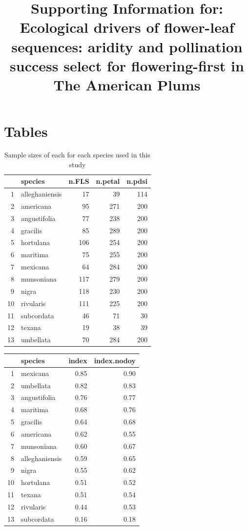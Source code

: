 \documentclass{article}[11pt]
\title{Supporting Information for: Ecological drivers of flower-leaf sequences: aridity and pollination success select for flowering-first in The American Plums} %
\date{}
\begin{document}

\maketitle

\section*{Tables}
\begin{table}[ht]
\centering
\begin{tabular}{rlrrr}
  \hline
 & species & n.FLS & n.petal & n.pdsi \\ 
  \hline
1 & alleghaniensis &  17 &  39 & 114 \\ 
  2 & americana &  95 & 271 & 200 \\ 
  3 & angustifolia &  77 & 238 & 200 \\ 
  4 & gracilis &  85 & 289 & 200 \\ 
  5 & hortulana & 106 & 254 & 200 \\ 
  6 & maritima &  75 & 255 & 200 \\ 
  7 & mexicana &  64 & 284 & 200 \\ 
  8 & munsoniana & 117 & 279 & 200 \\ 
  9 & nigra & 118 & 230 & 200 \\ 
  10 & rivularis & 111 & 225 & 200 \\ 
  11 & subcordata &  46 &  71 &  30 \\ 
  12 & texana &  19 &  38 &  39 \\ 
  13 & umbellata &  70 & 284 & 200 \\ 
   \hline
\end{tabular}
\caption{Sample sizes of each for each species used in this study}
\label{tab:samps}
\end{table}

\begin{table}[ht]
\centering
\begin{tabular}{rlrr}
  \hline
 & species & index & index.nodoy \\ 
  \hline
1 & mexicana & 0.85 & 0.90 \\ 
  2 & umbellata & 0.82 & 0.83 \\ 
  3 & angustifolia & 0.76 & 0.77 \\ 
  4 & maritima & 0.68 & 0.76 \\ 
  5 & gracilis & 0.64 & 0.68 \\ 
  6 & americana & 0.62 & 0.55 \\ 
  7 & munsoniana & 0.60 & 0.67 \\ 
  8 & alleghaniensis & 0.59 & 0.65 \\ 
  9 & nigra & 0.55 & 0.62 \\ 
  10 & hortulana & 0.51 & 0.52 \\ 
  11 & texana & 0.51 & 0.54 \\ 
  12 & rivularis & 0.44 & 0.53 \\ 
  13 & subcordata & 0.16 & 0.18 \\ 
   \hline
\end{tabular}
\end{table}
\end{document}
